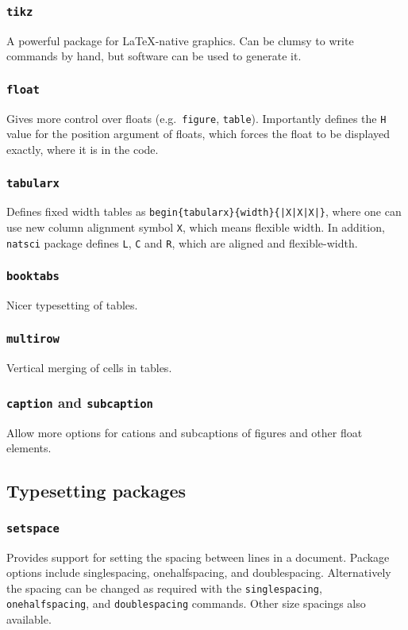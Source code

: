 \documentclass{article}
\begin{document}
\subsubsection{\texttt{tikz}}
A powerful package for \LaTeX-native graphics. Can be clumsy to write commands by hand, but software can be used to generate it.
\subsubsection{\texttt{float}}
Gives more control over floats (e.g.\ \texttt{figure}, \texttt{table}). Importantly defines the \texttt{H} value for the position argument of floats, which forces the float to be displayed exactly, where it is in the code.
\subsubsection{\texttt{tabularx}}
Defines fixed width tables as \texttt{begin\{tabularx\}\{width\}\{|X|X|X|\}}, where one can use new column alignment symbol \texttt{X}, which means flexible width. In addition, \texttt{natsci} package defines \texttt{L}, \texttt{C} and \texttt{R}, which are aligned and flexible-width.
\subsubsection{\texttt{booktabs}}
Nicer typesetting of tables.
\subsubsection{\texttt{multirow}}
Vertical merging of cells in tables.
\subsubsection{\texttt{caption} and \texttt{subcaption}}
Allow more options for cations and subcaptions of figures and other float elements.

\subsection{Typesetting packages}
\subsubsection{\texttt{setspace}}
Provides support for setting the spacing between lines in a document. Package options include singlespacing, onehalfspacing, and doublespacing. Alternatively the spacing can be changed as required with the \texttt{singlespacing}, \texttt{onehalfspacing}, and \texttt{doublespacing} commands. Other size spacings also available.
\end{document}
